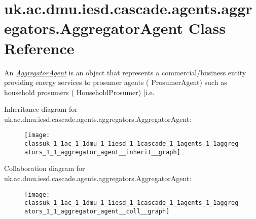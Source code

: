 \hypertarget{classuk_1_1ac_1_1dmu_1_1iesd_1_1cascade_1_1agents_1_1aggregators_1_1_aggregator_agent}{\section{uk.\-ac.\-dmu.\-iesd.\-cascade.\-agents.\-aggregators.\-Aggregator\-Agent Class Reference}
\label{classuk_1_1ac_1_1dmu_1_1iesd_1_1cascade_1_1agents_1_1aggregators_1_1_aggregator_agent}
}


An {\itshape \hyperlink{classuk_1_1ac_1_1dmu_1_1iesd_1_1cascade_1_1agents_1_1aggregators_1_1_aggregator_agent}{Aggregator\-Agent}} is an object that represents a commercial/business entity providing energy services to prosumer agents ( {\ttfamily Prosumer\-Agent}) such as household prosumers ( {\ttfamily Household\-Prosumer}) \mbox{[}i.\-e.  




Inheritance diagram for uk.\-ac.\-dmu.\-iesd.\-cascade.\-agents.\-aggregators.\-Aggregator\-Agent\-:\nopagebreak
\begin{figure}[H]
\begin{center}
\leavevmode
\texttt{[image: classuk\_1\_1ac\_1\_1dmu\_1\_1iesd\_1\_1cascade\_1\_1agents\_1\_1aggregators\_1\_1\_aggregator\_agent\_\_inherit\_\_graph]}
\end{center}
\end{figure}


Collaboration diagram for uk.\-ac.\-dmu.\-iesd.\-cascade.\-agents.\-aggregators.\-Aggregator\-Agent\-:\nopagebreak
\begin{figure}[H]
\begin{center}
\leavevmode
\texttt{[image: classuk\_1\_1ac\_1\_1dmu\_1\_1iesd\_1\_1cascade\_1\_1agents\_1\_1aggregators\_1\_1\_aggregator\_agent\_\_coll\_\_graph]}
\end{center}
\end{figure}

